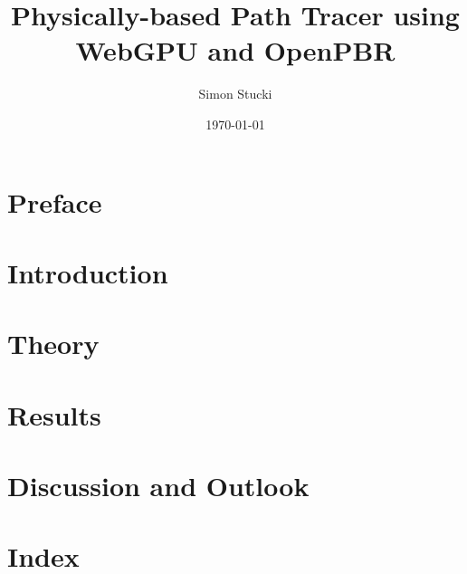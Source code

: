 \documentclass[a4paper, 11pt,abstract=on, listof=totocnumbered]{scrreprt}
\title{Physically-based Path Tracer using WebGPU and OpenPBR}
\author{Simon Stucki}
\date{\today}
\begin{document}


\clearpage
\setcounter{page}{1}


\begin{abstract}

\end{abstract}

\chapter*{Preface}


\renewcommand{\contentsname}{Contents}
\tableofcontents

\chapter{Introduction}


\chapter{Theory}


\chapter{Results}


\chapter{Discussion and Outlook}


\chapter{Index}


%
\end{document}
